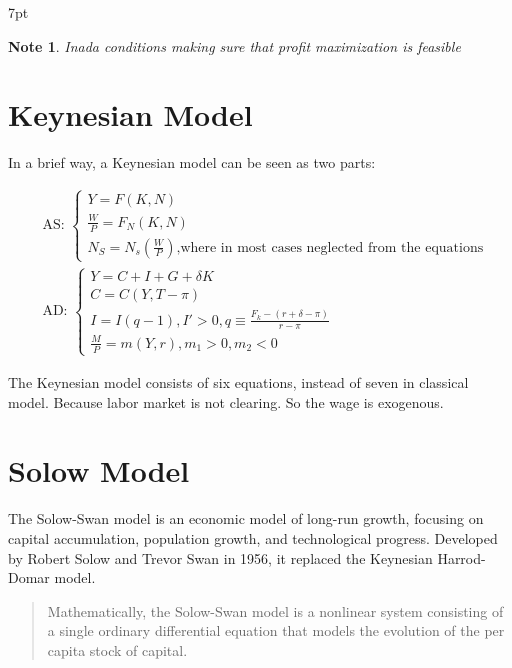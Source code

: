 \documentclass{article}
\newenvironment{blueblock}{
\def\FrameCommand{
  \hspace{1pt}
    {\color{DarkBlue}
    \vrule width 2pt}
    {\color{blueshade}
    \vrule width 4pt}
  \colorbox{blueshade}
}
\MakeFramed{
  \advance
  \hsize-
  \width
  \FrameRestore}
\noindent\hspace{-4.55pt}%
\begin{adjustwidth}{}{7pt}
\vspace{2pt}\vspace{2pt}
}
{\vspace{2pt}\end{adjustwidth}\endMakeFramed}
\newtheorem{note}{Note}
\begin{document}
\begin{blueblock}
\begin{note}  
Inada conditions making sure that profit maximization is feasible
\end{note}
\end{blueblock}




\newpage
\section{Keynesian Model}
In a brief way, a Keynesian model can be seen as two parts:

\begin{align}
&
\text{AS: }
\begin{cases}
Y=F(K,N) \\
\frac{W}{P}=F_{N}(K,N) \\
N_{S}=N_{s}\left(\frac{W}{P}\right)\text{,where in most cases neglected from the equations}
\end{cases}
\\&\text{AD: }
\begin{cases}
Y=C+I+G+\delta K \\
C=C(Y,T-\pi) \\
I=I(q-1), I'>0, q\equiv \frac{F_{k}-(r+\delta-\pi)}{r-\pi} \\
\frac{M}{P}=m(Y,r),m_{1}>0,m_{2}<0
\end{cases}
\end{align}


The Keynesian model consists of six equations, instead of seven in
classical model. Because labor market is not clearing. So the wage is exogenous.




\newpage
\section{Solow Model}


The Solow-Swan model is an economic model of long-run growth, focusing on capital accumulation, population growth, and technological progress. Developed by Robert Solow and Trevor Swan in 1956, it replaced the Keynesian Harrod-Domar model.

\begin{quote}
Mathematically, the Solow-Swan model is a nonlinear system consisting of a single ordinary differential equation that models the evolution of the per capita stock of capital.
\end{quote}
\end{document}
